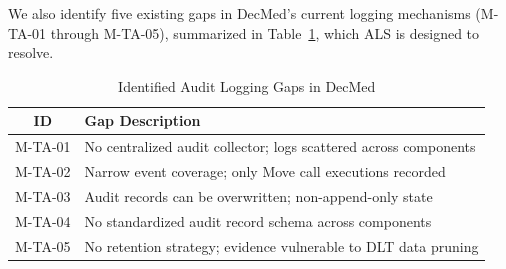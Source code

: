 We also identify five existing gaps in DecMed's current logging mechanisms
(M-TA-01 through M-TA-05), summarized in Table~\ref{tab:gaps}, which ALS
is designed to resolve.

\begin{table}[htbp]
    \caption{Identified Audit Logging Gaps in DecMed}
    \label{tab:gaps}
    \begin{center}
        \begin{tabular}{c p{5.5cm}}
            \toprule
            \textbf{ID} & \textbf{Gap Description} \\
            \midrule
            M-TA-01 & No centralized audit collector; logs scattered across components \\
            M-TA-02 & Narrow event coverage; only Move call executions recorded \\
            M-TA-03 & Audit records can be overwritten; non-append-only state \\
            M-TA-04 & No standardized audit record schema across components \\
            M-TA-05 & No retention strategy; evidence vulnerable to DLT data pruning \\
            \bottomrule
        \end{tabular}
    \end{center}
\end{table}